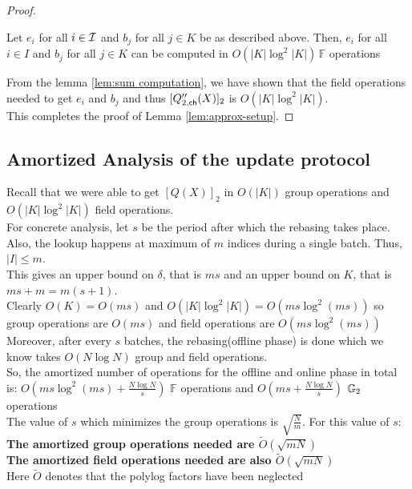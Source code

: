 \begin{proof}
    \begin{lemma}\label{lem:sum computation}
    Let $e_i$ for all $i \in \mathcal{I}$ and $b_j$ for all $j \in K$ be as described above.
    Then, $e_i$ for all $i \in I$ and $b_j$ for all $j \in K$ can be computed in $O(|K|\log^2|K|)\, \mathbb{F}$ operations
    \end{lemma}

    From the lemma \ref{lem:sum computation}, we have shown that the field operations needed to get $e_i$ and $b_j$ and thus $[Q''_{2,\mathsf{ch}}({X})]_2$ is $O(|K|\log^2|K|)$. \\

    This completes the proof of Lemma \ref{lem:approx-setup}.
\end{proof}

\subsection{Amortized Analysis of the update protocol}
Recall that we were able to get $[Q(X)]_2$ in $O(|K|)$ group operations and $O(|K|\log^2|K|)$ field operations. \\
For concrete analysis, let $s$ be the period after which the rebasing takes place. Also, the lookup happens at maximum of $m$ indices during a single batch. Thus, $|I|\leq m$.\\
This gives an upper bound on $\delta$, that is $ms$ and an upper bound on $K$, that is $ms+m=m(s+1)$.\\

Clearly $O(K)=O(ms)$ and $O(|K|\log^2|K|)=O(ms \log^2(ms))$ so group operations are $O(ms)$ and field operations are $O(ms\log^2(ms))$ \\

Moreover, after every $s$ batches, the rebasing(offline phase) is done which we know takes $O(N\log N)$ group and field operations.\\

So, the amortized number of operations for the offline and online phase in total is:
$O(ms \log^2(ms)+\frac{N\log N}{s})$ $\mathbb{F}$ operations and $O(ms +\frac{N\log N}{s})$ $\mathbb{G}_2$ operations\\

The value of $s$ which minimizes the group operations is $\sqrt{\frac{N}{m}}$. For this value of $s$:\\
\textbf{The amortized group operations needed are $\tilde{O}(\sqrt{mN})$}\\
\textbf{The amortized field operations needed are also $\tilde{O}(\sqrt{mN})$}\\
Here $\tilde{O}$ denotes that the polylog factors have been neglected\\\\
